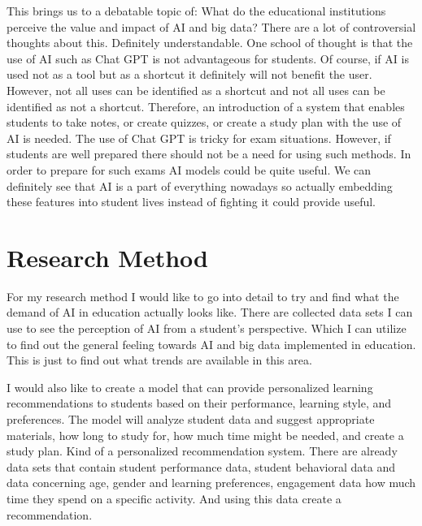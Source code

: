\documentclass{imc-inf}
\begin{document}
This brings us to a debatable topic of: What do the educational institutions perceive the value and impact of AI and big data? There are a lot of controversial thoughts about this. Definitely understandable. One school of thought is that the use of AI such as Chat GPT is not advantageous for students. Of course, if AI is used not as a tool but as a shortcut it definitely will not benefit the user. However, not all uses can be identified as a shortcut and not all uses can be identified as not a shortcut. Therefore, an introduction of a system that enables students to take notes, or create quizzes, or create a study plan with the use of AI is needed. The use of Chat GPT is tricky for exam situations. However, if students are well prepared there should not be a need for using such methods. In order to prepare for such exams AI models could be quite useful. We can definitely see that AI is a part of everything nowadays so actually embedding these features into student lives instead of fighting it could provide useful. 


\section{Research Method }
For my research method I would like to go into detail to try and find what the demand of AI in education actually looks like. There are collected data sets I can use to see the perception of AI from a student’s perspective. Which I can utilize to find out the general feeling towards AI and big data implemented in education. This is just to find out what trends are available in this area. 

I would also like to create a model that can provide personalized learning recommendations to students based on their performance, learning style, and preferences. The model will analyze student data and suggest appropriate materials, how long to study for, how much time might be needed, and create a study plan. Kind of a personalized recommendation system. 
There are already data sets that contain student performance data, student behavioral data and data concerning age, gender and learning preferences, engagement data how much time they spend on a specific activity. And using this data create a recommendation. 
\end{document}
